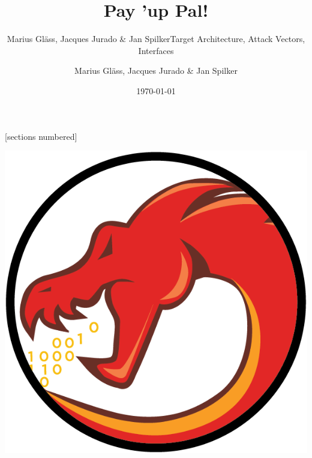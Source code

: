 \documentclass[accentcolor=tud8b,colorbacktitle,inverttitle,landscape,presentation,t]{tudbeamer}
\begin{document}
[sections numbered]

\makeatletter
\AtBeginPart{\beamer@tocsectionnumber=0\relax\setcounter{section}{0}}
\makeatother

\newcommand{\myTitle}{Pay 'up Pal!}
\newcommand{\myName}{Marius Gläss, Jacques Jurado \& Jan Spilker}
\newcommand{\presentationType}{Target Architecture, Attack Vectors, Interfaces}

\title{\myTitle}
\subtitle{\myName\hfill \presentationType}
\author{\myName}
\date{\today}

\begin{titleframe}
	\begin{center}
	\includegraphics{ghidra_logo.png}
	\end{center}
\end{titleframe}
\end{document}
